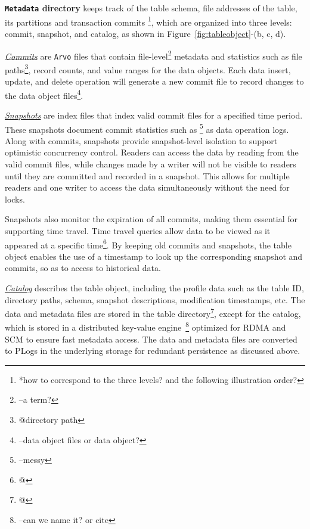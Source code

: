 \noindent \textbf{\texttt{Metadata} directory}  keeps track of the table schema, file addresses of the table, its partitions and transaction commits \footnote{*how to correspond to the three levels? and the following illustration order?}, which are organized into three levels: commit, snapshot, and catalog, as shown in Figure~\ref{fig:tableobject}-(b, c, d).

 \noindent \underline{\textit{Commits}} are \texttt{Arvo} files that contain file-level\footnote{--a term?} metadata and statistics such as file paths\footnote{@directory path}, record counts, and value ranges for the data objects. Each data insert, update, and delete operation will generate a new commit file to record changes to the data object files\footnote{--data object files or data object?}.


\noindent \underline{\textit{Snapshots}} are index files that index  valid commit files for a specified time period. These snapshots document commit statistics such as \footnote{--messy} as data operation logs. Along with commits, snapshots provide snapshot-level isolation to support optimistic concurrency control. Readers can access the data by reading from the valid commit files, while changes made by a writer will not be visible to readers until they are committed and recorded in a snapshot. This allows for multiple readers and one writer to access the data simultaneously without the need for locks. 

Snapshots also monitor the expiration of all commits, making them essential for supporting time travel. Time travel queries allow data to be viewed as it appeared at a specific time\footnote{@}. By keeping old commits and snapshots, the table object enables the use of a timestamp to look up the corresponding snapshot and commits, so as to access to historical data.

\noindent \underline{\textit{Catalog}}  describes the table object, including the profile data  such as the table ID, directory paths, schema, snapshot descriptions, modification timestamps, etc. The data and metadata files are stored in the table directory\footnote{@}, except for the catalog, which is stored in a distributed key-value engine~\footnote{--can we name it? or cite} optimized for RDMA and SCM to ensure fast metadata access. The data and metadata files are converted to PLogs in the underlying storage for redundant persistence as discussed above.




